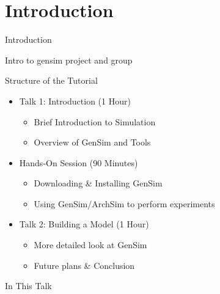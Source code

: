 
\section{Introduction}

\begin{frame}[t]{Introduction}

Intro to gensim project and group

\end{frame}

\begin{frame}{Structure of the Tutorial}

\begin{itemize}
\item Talk 1: Introduction (1 Hour)
\begin{itemize}
	\item Brief Introduction to Simulation
	\item Overview of GenSim and Tools
\end{itemize}

\item Hands-On Session (90 Minutes)
\begin{itemize}
	\item Downloading \& Installing GenSim
	\item Using GenSim/ArchSim to perform experiments
\end{itemize}

\item Talk 2: Building a Model (1 Hour)
\begin{itemize}
	\item More detailed look at GenSim
	\item Future plans \& Conclusion
\end{itemize}

\end{itemize}

\end{frame}

\begin{frame}{In This Talk}
	\tableofcontents
\end{frame}	
